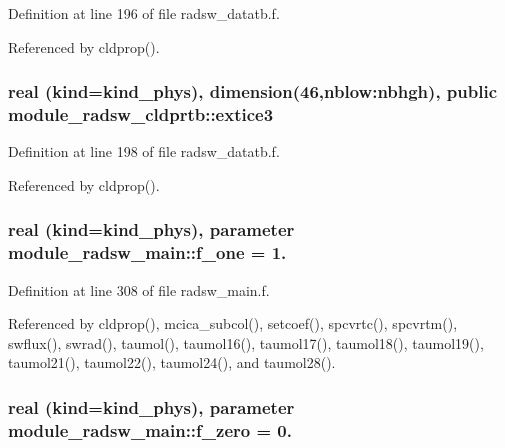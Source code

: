 Definition at line 196 of file radsw\+\_\+datatb.\+f.



Referenced by cldprop().

\subsubsection[{\texorpdfstring{extice3}{extice3}}]{\setlength{\rightskip}{0pt plus 5cm}real (kind=kind\+\_\+phys), dimension(46,nblow\+:nbhgh), public module\+\_\+radsw\+\_\+cldprtb\+::extice3}\hypertarget{group__module__radsw__main_ga8b8bae831aa5b460e260c94e7f24f4c7}{}\label{group__module__radsw__main_ga8b8bae831aa5b460e260c94e7f24f4c7}


Definition at line 198 of file radsw\+\_\+datatb.\+f.



Referenced by cldprop().

\subsubsection[{\texorpdfstring{f\+\_\+one}{f_one}}]{\setlength{\rightskip}{0pt plus 5cm}real (kind=kind\+\_\+phys), parameter module\+\_\+radsw\+\_\+main\+::f\+\_\+one = 1.\hspace{0.3cm}{\ttfamily [private]}}\hypertarget{group__module__radsw__main_gad256aaca9c9d6b5d161ae21f68989db6}{}\label{group__module__radsw__main_gad256aaca9c9d6b5d161ae21f68989db6}


Definition at line 308 of file radsw\+\_\+main.\+f.



Referenced by cldprop(), mcica\+\_\+subcol(), setcoef(), spcvrtc(), spcvrtm(), swflux(), swrad(), taumol(), taumol16(), taumol17(), taumol18(), taumol19(), taumol21(), taumol22(), taumol24(), and taumol28().

\subsubsection[{\texorpdfstring{f\+\_\+zero}{f_zero}}]{\setlength{\rightskip}{0pt plus 5cm}real (kind=kind\+\_\+phys), parameter module\+\_\+radsw\+\_\+main\+::f\+\_\+zero = 0.\hspace{0.3cm}{\ttfamily [private]}}\hypertarget{group__module__radsw__main_gad54ac2d2bd5c4b3bd692c76d2a0bcc5d}{}\label{group__module__radsw__main_gad54ac2d2bd5c4b3bd692c76d2a0bcc5d}


